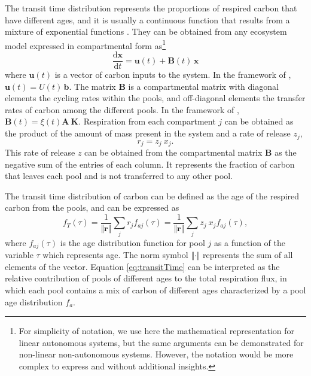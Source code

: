 \documentclass[bg, manuscript]{copernicus}
\begin{document}
The transit time distribution represents the proportions of respired carbon that have different ages, and it is usually a continuous function that results from a mixture of exponential functions \citep{Metzler2018MG}. They can be obtained from any ecosystem model expressed in compartmental form as\footnote{For simplicity of notation, we use here the mathematical representation for linear autonomous systems, but the same arguments can be demonstrated for non-linear non-autonomous systems. However, the notation would be more complex to express and without additional insights.}
\begin{equation}
\frac{\mathrm{d}\bm{x}}{\mathrm{d}t} = \bm{u}(t) + \mathbf{B}(t) \, \bm{x}
\end{equation}
where $\bm{u}(t)$ is a vector of carbon inputs to the system. In the framework of \citet{Luo2017, Luo2022}, $\bm{u}(t) = U(t)\, \bm{b}$. The matrix $\mathbf{B}$ is a compartmental matrix with diagonal elements the cycling rates within the pools, and off-diagonal elements the transfer rates of carbon among the different pools. In the framework of \citet{Luo2017, Luo2022}, $\mathbf{B}(t) = \xi(t) \mathbf{A \ K}$. Respiration from each compartment $j$ can be obtained as the product of the amount of mass present in the system and a rate of release $z_j$, 
\begin{equation}
r_j = z_j \ x_j.
\end{equation}
This rate of release $z$ can be obtained from the compartmental matrix $\mathbf{B}$ as the negative sum of the entries of each column. It represents the fraction of carbon that leaves each pool and is not transferred to any other pool.

The transit time distribution of carbon can be defined as the age of the respired carbon from the pools, and can be expressed as \citep{Metzler2018MG}
\begin{equation} \label{eq:transitTime}
f_T(\tau) = \frac{1}{\Vert \bm{r} \Vert} \sum_j r_j f_{aj}(\tau) =  \frac{1}{\Vert \bm{r} \Vert} \sum_j z_j \ x_j f_{aj}(\tau),
\end{equation}
where $f_{aj} (\tau)$ is the age distribution function for pool $j$ as a function of the variable $\tau$ which represents age. The norm symbol $\Vert \cdot \Vert$ represents the sum of all elements of the vector. Equation \ref{eq:transitTime} can be interpreted as the relative contribution of pools of different ages to the total respiration flux, in which each pool contains a mix of carbon of different ages characterized by a pool age distribution $f_a$. 
\end{document}
